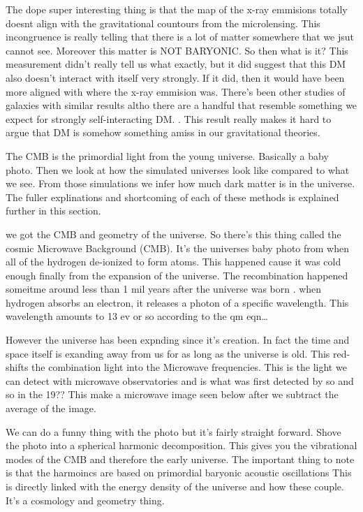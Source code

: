 The dope super interesting thing is that the map of the x-ray emmisions totally doesnt align with the gravitational countours from the microlensing.
This incongruence is really telling that there is a lot of matter somewhere that we jsut cannot see.
Moreover this matter is NOT BARYONIC.
So then what is it?
This measurement didn't really tell us what exactly, but it did suggest that this DM also doesn't interact with itself very strongly.
If it did, then it would have been more aligned with where the x-ray emmision was.
There's been other studies of galaxies with similar results altho there are a handful that resemble something we expect for strongly self-interacting DM. \ns.
This result really makes it hard to argue that DM is somehow something amiss in our gravitational theories.

The CMB is the primordial light from the young universe.
Basically a baby photo.
Then we look at how the simulated universes look like compared to what we see.
From those simulations we infer how much dark matter is in the universe.
The fuller explinations and shortcoming of each of these methods is explained further in this section.

we got the CMB and geometry of the universe.
So there's this thing called the cosmic Microwave Background (CMB).
It's the universes baby photo from when all of the hydrogen de-ionized to form atoms.
This happened cause it was cold enough finally from the expansion of the universe.
The recombination happened someitme around less than 1 mil years after the universe was born \fu \ns.
when hydrogen absorbs an electron, it releases a photon of a specific wavelength.
This wavelength amounts to 13 ev or so according to the qm eqn\dots


However the universe has been expnding since it's creation.
In fact the time and space itself is exanding away from us for as long as the universe is old.
This red-shifts the combination light into the Microwave frequencies.
This is the light we can detect with microwave observatories and is what was first detected by so and so in the 19?? \ns \fu
This make a microwave image seen below after we subtract the average of the image.


We can do a funny thing with the photo but it's fairly straight forward.
Shove the photo into a spherical harmonic decomposition.
This gives you the vibrational modes of the CMB and therefore the early universe.
The important thing to note is that the harmoincs are based on primordial baryonic acoustic oscillations \fu
This is directly linked with the energy density of the universe and how these couple.
It's a cosmology and geometry thing.


